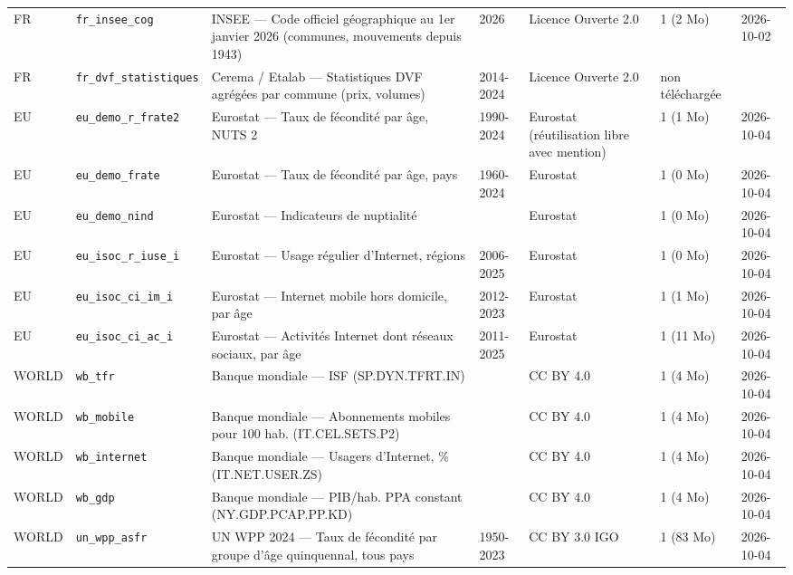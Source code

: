\begin{longtable}{lp{2.2cm}p{3.9cm}p{2.1cm}p{1.9cm}p{1.4cm}p{1.6cm}}
FR & \texttt{fr\_\allowbreak{}insee\_\allowbreak{}cog} & INSEE — Code officiel géographique au 1er janvier 2026 (communes, mouvements depuis 1943) & 2026 & Licence Ouverte 2.0 & 1 (2 Mo) & 2026-10-02 \\
FR & \texttt{fr\_\allowbreak{}dvf\_\allowbreak{}statistiques} & Cerema / Etalab — Statistiques DVF agrégées par commune (prix, volumes) & 2014-2024 & Licence Ouverte 2.0 & non téléchargée &  \\
EU & \texttt{eu\_\allowbreak{}demo\_\allowbreak{}r\_\allowbreak{}frate2} & Eurostat — Taux de fécondité par âge, NUTS 2 & 1990-2024 & Eurostat (réutilisation libre avec mention) & 1 (1 Mo) & 2026-10-04 \\
EU & \texttt{eu\_\allowbreak{}demo\_\allowbreak{}frate} & Eurostat — Taux de fécondité par âge, pays & 1960-2024 & Eurostat & 1 (0 Mo) & 2026-10-04 \\
EU & \texttt{eu\_\allowbreak{}demo\_\allowbreak{}nind} & Eurostat — Indicateurs de nuptialité &  & Eurostat & 1 (0 Mo) & 2026-10-04 \\
EU & \texttt{eu\_\allowbreak{}isoc\_\allowbreak{}r\_\allowbreak{}iuse\_\allowbreak{}i} & Eurostat — Usage régulier d'Internet, régions & 2006-2025 & Eurostat & 1 (0 Mo) & 2026-10-04 \\
EU & \texttt{eu\_\allowbreak{}isoc\_\allowbreak{}ci\_\allowbreak{}im\_\allowbreak{}i} & Eurostat — Internet mobile hors domicile, par âge & 2012-2023 & Eurostat & 1 (1 Mo) & 2026-10-04 \\
EU & \texttt{eu\_\allowbreak{}isoc\_\allowbreak{}ci\_\allowbreak{}ac\_\allowbreak{}i} & Eurostat — Activités Internet dont réseaux sociaux, par âge & 2011-2025 & Eurostat & 1 (11 Mo) & 2026-10-04 \\
WORLD & \texttt{wb\_\allowbreak{}tfr} & Banque mondiale — ISF (SP.DYN.TFRT.IN) &  & CC BY 4.0 & 1 (4 Mo) & 2026-10-04 \\
WORLD & \texttt{wb\_\allowbreak{}mobile} & Banque mondiale — Abonnements mobiles pour 100 hab. (IT.CEL.SETS.P2) &  & CC BY 4.0 & 1 (4 Mo) & 2026-10-04 \\
WORLD & \texttt{wb\_\allowbreak{}internet} & Banque mondiale — Usagers d'Internet, \% (IT.NET.USER.ZS) &  & CC BY 4.0 & 1 (4 Mo) & 2026-10-04 \\
WORLD & \texttt{wb\_\allowbreak{}gdp} & Banque mondiale — PIB/hab. PPA constant (NY.GDP.PCAP.PP.KD) &  & CC BY 4.0 & 1 (4 Mo) & 2026-10-04 \\
WORLD & \texttt{un\_\allowbreak{}wpp\_\allowbreak{}asfr} & UN WPP 2024 — Taux de fécondité par groupe d'âge quinquennal, tous pays & 1950-2023 & CC BY 3.0 IGO & 1 (83 Mo) & 2026-10-04 \\

\end{longtable}
